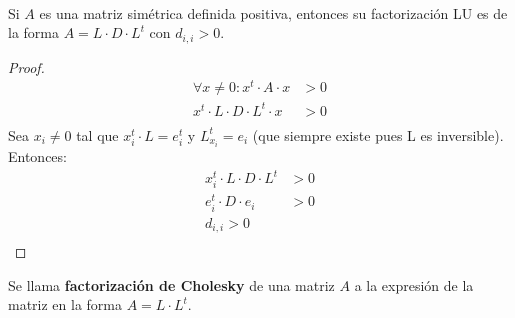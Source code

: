 \documentclass[]{article}
\begin{document}
~\newline
\begin{cor}\label{sdp_implica_ldlt}
	Si $A$ es una matriz simétrica definida positiva, entonces su factorización LU es de la forma $A= L\cdot D\cdot L^t$ con $d_{i,i}> 0$.
	\begin{proof}
		\begin{align*}
			\forall x\neq 0 : x^t\cdot A\cdot x &> 0\\
			x^t\cdot L \cdot D \cdot L^t \cdot x &> 0\\
		\end{align*}
		Sea $x_i\neq0$ tal que $x_i^t\cdot L = e_i^t$ y $L_{x_i}^t = e_i$ (que siempre existe pues L es inversible). Entonces:
		\begin{align*}
			x_i^t\cdot L \cdot D \cdot L^t &>0\\
			e_i^t \cdot D \cdot e_i &> 0\\
			d_{i,i} > 0\\
		\end{align*}
	\end{proof}
\end{cor}

\begin{defi}
	Se llama \textbf{factorización de Cholesky} de una matriz $A$ a la expresión de la matriz en la forma $A = L\cdot L^t$.
\end{defi}
\end{document}
